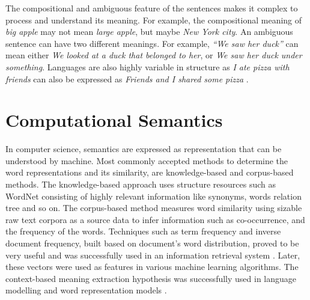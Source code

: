 \documentclass[12pt]{report} %
\begin{document}
	
	The compositional and ambiguous feature of the sentences makes it complex to process and understand its meaning. For example, the compositional meaning of \textit{big apple} may not mean \textit{large apple}, but maybe \textit{New York city}. An ambiguous sentence can have two different meanings. For example, \textit{\textquotedblleft We saw her duck\textquotedblright} can mean either \textit{We looked at a duck that belonged to her}, or \textit{We saw her duck under something}. Languages are also highly variable in structure as \textit{I ate pizza with friends} can also be expressed as \textit{Friends and I shared some pizza} \citep{jurafsky2014speech}. %
	
	
	
	
	
	
	\section{Computational Semantics}
	\label{com_sem}
	
	In computer science, semantics are expressed as representation that can be understood by machine. Most commonly accepted methods to determine the word representations and its similarity, are knowledge-based and corpus-based methods. The knowledge-based approach uses structure resources such as WordNet \citep{pedersen2004wordnet} consisting of highly relevant information like synonyms, words relation tree and so on. The corpus-based method measures word similarity using sizable raw text corpora as a source data to infer information such as co-occurrence, and the frequency of the words.
	Techniques such as term frequency and inverse document frequency, built based on document's word distribution, proved to be very useful and was successfully used in an information retrieval system \citep{salton1971smart, deerwester1989computer}. 
	Later, these vectors were used as features in various machine learning algorithms. The context-based meaning extraction hypothesis was successfully used in language modelling \citep{bengio2003neural,collobert2008unified,collobert2011natural,mikolov2011extensions} and word representation models \citep{mikolov2014word2vec,pennington2014glove}. 
	
\end{document}
